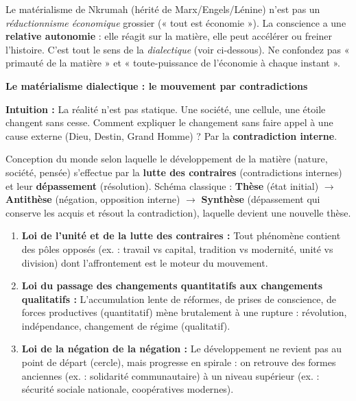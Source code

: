 \documentclass[11pt]{article}
\begin{document}
\begin{attention}
Le matérialisme de Nkrumah (hérité de Marx/Engels/Lénine) n'est pas un \emph{réductionnisme économique} grossier (« tout est économie »). La conscience a une \textbf{relative autonomie} : elle réagit sur la matière, elle peut accélérer ou freiner l'histoire. C'est tout le sens de la \emph{dialectique} (voir ci-dessous). Ne confondez pas « primauté de la matière » et « toute-puissance de l'économie à chaque instant ».
\end{attention}

\textbf{Le matérialisme dialectique : le mouvement par contradictions}\par

\textbf{Intuition :} La réalité n'est pas statique. Une société, une cellule, une étoile changent sans cesse. Comment expliquer le changement sans faire appel à une cause externe (Dieu, Destin, Grand Homme) ? Par la \textbf{contradiction interne}.

\begin{definition}
Conception du monde selon laquelle le développement de la matière (nature, société, pensée) s'effectue par la \textbf{lutte des contraires} (contradictions internes) et leur \textbf{dépassement} (résolution). Schéma classique : \textbf{Thèse} (état initial) $\rightarrow$ \textbf{Antithèse} (négation, opposition interne) $\rightarrow$ \textbf{Synthèse} (dépassement qui conserve les acquis et résout la contradiction), laquelle devient une nouvelle thèse.
\end{definition}

\begin{propriete}
\begin{enumerate}
    \item \textbf{Loi de l'unité et de la lutte des contraires :} Tout phénomène contient des pôles opposés (ex. : travail vs capital, tradition vs modernité, unité vs division) dont l'affrontement est le moteur du mouvement.
    \item \textbf{Loi du passage des changements quantitatifs aux changements qualitatifs :} L'accumulation lente de réformes, de prises de conscience, de forces productives (quantitatif) mène brutalement à une rupture : révolution, indépendance, changement de régime (qualitatif).
    \item \textbf{Loi de la négation de la négation :} Le développement ne revient pas au point de départ (cercle), mais progresse en spirale : on retrouve des formes anciennes (ex. : solidarité communautaire) à un niveau supérieur (ex. : sécurité sociale nationale, coopératives modernes).
\end{enumerate}
\end{propriete}
\end{document}
